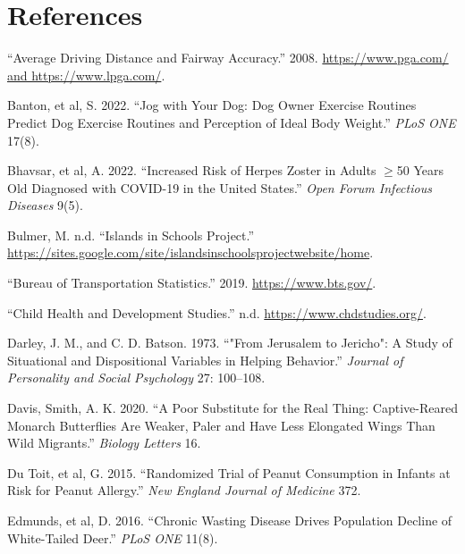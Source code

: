 \documentclass[
]{report}
\newlength{\cslhangindent}
\newenvironment{CSLReferences}[2] %
 {\begin{list}{}{%
  \setlength{\itemindent}{0pt}
  \setlength{\leftmargin}{0pt}
  \setlength{\parsep}{0pt}
  \ifodd #1
   \setlength{\leftmargin}{\cslhangindent}
   \setlength{\itemindent}{-1\cslhangindent}
  \fi
  \setlength{\itemsep}{#2\baselineskip}}}
 {\end{list}}
\begin{document}
\newpage

\chapter*{References}\label{references}

\label{refs}
\begin{CSLReferences}{1}{0}
{``Average Driving Distance and Fairway Accuracy.''} 2008. \href{https://www.pga.com/\%20and\%20https://www.lpga.com/}{https://www.pga.com/ and https://www.lpga.com/}.

Banton, et al, S. 2022. {``Jog with Your Dog: Dog Owner Exercise Routines Predict Dog Exercise Routines and Perception of Ideal Body Weight.''} \emph{PLoS ONE} 17(8).

Bhavsar, et al, A. 2022. {``Increased Risk of Herpes Zoster in Adults \(\geq\)50 Years Old Diagnosed with COVID-19 in the United States.''} \emph{Open Forum Infectious Diseases} 9(5).

Bulmer, M. n.d. {``Islands in Schools Project.''} \url{https://sites.google.com/site/islandsinschoolsprojectwebsite/home}.

{``Bureau of Transportation Statistics.''} 2019. \url{https://www.bts.gov/}.

{``Child Health and Development Studies.''} n.d. \url{https://www.chdstudies.org/}.

Darley, J. M., and C. D. Batson. 1973. {``"From Jerusalem to Jericho": A Study of Situational and Dispositional Variables in Helping Behavior.''} \emph{Journal of Personality and Social Psychology} 27: 100--108.

Davis, Smith, A. K. 2020. {``A Poor Substitute for the Real Thing: Captive-Reared Monarch Butterflies Are Weaker, Paler and Have Less Elongated Wings Than Wild Migrants.''} \emph{Biology Letters} 16.

Du Toit, et al, G. 2015. {``Randomized Trial of Peanut Consumption in Infants at Risk for Peanut Allergy.''} \emph{New England Journal of Medicine} 372.

Edmunds, et al, D. 2016. {``Chronic Wasting Disease Drives Population Decline of White-Tailed Deer.''} \emph{PLoS ONE} 11(8).


\end{CSLReferences}
\end{document}
